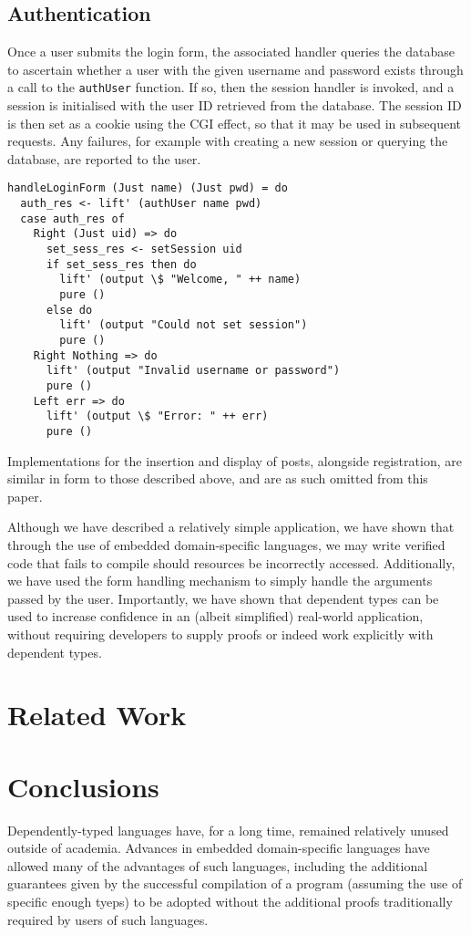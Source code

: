 \documentclass[preprint]{sigplanconf}
\begin{document}
\subsection{Authentication}
Once a user submits the login form, the associated handler queries the database to ascertain whether a user with the given username and password exists through a call to the \texttt{authUser} function. If so, then the session handler is invoked, and a session is initialised with the user ID retrieved from the database. The session ID is then set as a cookie using the CGI effect, so that it may be used in subsequent requests. Any failures, for example with creating a new session or querying the database, are reported to the user.
{\small
\begin{verbatim}
handleLoginForm (Just name) (Just pwd) = do
  auth_res <- lift' (authUser name pwd)
  case auth_res of
    Right (Just uid) => do
      set_sess_res <- setSession uid
      if set_sess_res then do
        lift' (output \$ "Welcome, " ++ name)
        pure ()
      else do
        lift' (output "Could not set session")
        pure ()
    Right Nothing => do
      lift' (output "Invalid username or password")
      pure ()
    Left err => do
      lift' (output \$ "Error: " ++ err)
      pure ()
\end{verbatim}}
Implementations for the insertion and display of posts, alongside registration, are similar in form to those described above, and are as such omitted from this paper.

Although we have described a relatively simple application, we have shown that through the use of embedded domain-specific languages, we may write verified code that fails to compile should resources be incorrectly accessed. Additionally, we have used the form handling mechanism to simply handle the arguments passed by the user. Importantly, we have shown that dependent types can be used to increase confidence in an (albeit simplified) real-world application, without requiring developers to supply proofs or indeed work explicitly with dependent types. 

\section{Related Work}


\section{Conclusions}
Dependently-typed languages have, for a long time, remained relatively unused outside of academia. Advances in embedded domain-specific languages have allowed many of the advantages of such languages, including the additional guarantees given by the successful compilation of a program (assuming the use of specific enough tyeps) to be adopted without the additional proofs traditionally required by users of such languages.
\end{document}
